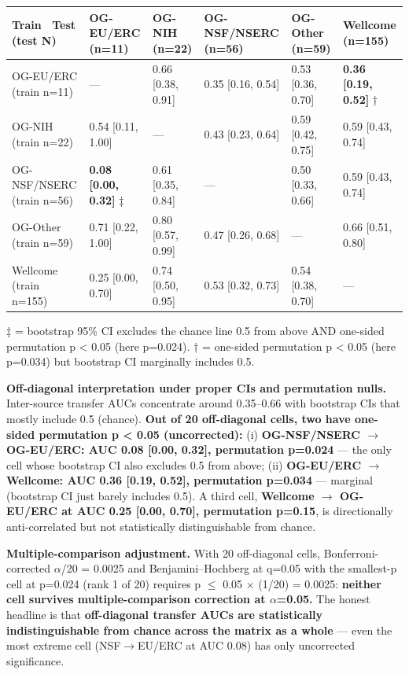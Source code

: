 \documentclass[11pt]{article}
\begin{document}
\begin{table}[H]
\centering
\small
\begin{tabular}{llllll}
\toprule
Train \ Test (test N) & OG-EU/ERC (n=11) & OG-NIH (n=22) & OG-NSF/NSERC (n=56) & OG-Other (n=59) & Wellcome (n=155) \\
\midrule
OG-EU/ERC (train n=11) & --- & 0.66 [0.38, 0.91] & 0.35 [0.16, 0.54] & 0.53 [0.36, 0.70] & \textbf{0.36 [0.19, 0.52]} † \\
OG-NIH (train n=22) & 0.54 [0.11, 1.00] & --- & 0.43 [0.23, 0.64] & 0.59 [0.42, 0.75] & 0.59 [0.43, 0.74] \\
OG-NSF/NSERC (train n=56) & \textbf{0.08 [0.00, 0.32]} ‡ & 0.61 [0.35, 0.84] & --- & 0.50 [0.33, 0.66] & 0.59 [0.43, 0.74] \\
OG-Other (train n=59) & 0.71 [0.22, 1.00] & 0.80 [0.57, 0.99] & 0.47 [0.26, 0.68] & --- & 0.66 [0.51, 0.80] \\
Wellcome (train n=155) & 0.25 [0.00, 0.70] & 0.74 [0.50, 0.95] & 0.53 [0.32, 0.73] & 0.54 [0.38, 0.70] & --- \\
\bottomrule
\end{tabular}
\end{table}

‡ = bootstrap 95\% CI excludes the chance line 0.5 from above AND one-sided permutation p < 0.05 (here p=0.024). † = one-sided permutation p < 0.05 (here p=0.034) but bootstrap CI marginally includes 0.5.

\textbf{Off-diagonal interpretation under proper CIs and permutation nulls.} Inter-source transfer AUCs concentrate around 0.35--0.66 with bootstrap CIs that mostly include 0.5 (chance). \textbf{Out of 20 off-diagonal cells, two have one-sided permutation p < 0.05 (uncorrected):} (i) \textbf{OG-NSF/NSERC $\rightarrow$ OG-EU/ERC: AUC 0.08 [0.00, 0.32], permutation p=0.024} --- the only cell whose bootstrap CI also excludes 0.5 from above; (ii) \textbf{OG-EU/ERC $\rightarrow$ Wellcome: AUC 0.36 [0.19, 0.52], permutation p=0.034} --- marginal (bootstrap CI just barely includes 0.5). A third cell, \textbf{Wellcome $\rightarrow$ OG-EU/ERC at AUC 0.25 [0.00, 0.70], permutation p=0.15}, is directionally anti-correlated but not statistically distinguishable from chance.

\textbf{Multiple-comparison adjustment.} With 20 off-diagonal cells, Bonferroni-corrected $\alpha$/20 = 0.0025 and Benjamini--Hochberg at q=0.05 with the smallest-p cell at p=0.024 (rank 1 of 20) requires p $\leq$ 0.05 $\times$ (1/20) = 0.0025: \textbf{neither cell survives multiple-comparison correction at $\alpha$=0.05.} The honest headline is that \textbf{off-diagonal transfer AUCs are statistically indistinguishable from chance across the matrix as a whole} --- even the most extreme cell (NSF$\rightarrow$EU/ERC at AUC 0.08) has only uncorrected significance.
\end{document}
